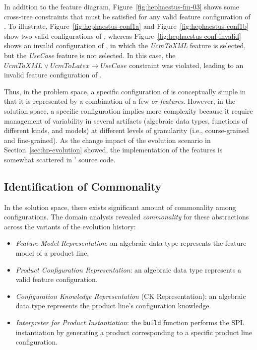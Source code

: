 
In addition to the feature diagram, Figure~\ref{fig:hephaestus-fm-03} shows some cross-tree constraints that must be satisfied for any valid feature configuration of \hpl.  To illustrate, Figure~\ref{fig:hephaestus-conf1a} and Figure~\ref{fig:hephaestus-conf1b} show two valid configurations of \hpl, whereas Figure~\ref{fig:hephaestus-conf-invalid} shows an invalid configuration of \hpl, in which the \emph{UcmToXML} feature is selected, but the \emph{UseCase} feature is not selected. In this case, the $UcmToXML \lor UcmToLatex \rightarrow Use Case$ constraint was violated, leading to an invalid feature configuration of \hpl.

Thus, in the problem space, a specific configuration of \hp{} is conceptually simple in that it is represented by a combination of a few \textit{or-features}. However, in the solution space, a specific configuration implies more complexity because it require management of variability in several artifacts (algebraic data types, functions of different kinds, and models) at different levels of granularity (i.e., course-grained and fine-grained). As the change impact of the evolution scenario in Section~\ref{sec:hp-evolution} showed, the implementation of the features is somewhat scattered in \hp' source code.


\subsection{Identification of Commonality} 
\label{sec:commonality}

In the solution space, there exists significant amount of commonality among configurations. 
The domain analysis revealed \emph{commonality} for these abstractions across the variants of the evolution history:

\begin{itemize}

\item \emph{Feature Model Representation}: an algebraic data type represents the feature model of a product line.
  
\item \emph{Product Configuration Representation}: an algebraic data type represents a valid feature configuration.

\item \emph{Configuration Knowledge Representation} (CK Representation): an algebraic data type represents the product line's configuration knowledge.

\item \emph{Interpreter for Product Instantiation}: the \texttt{build} function performs the SPL instantiation by generating a product corresponding to a specific product line configuration.

\end{itemize}

